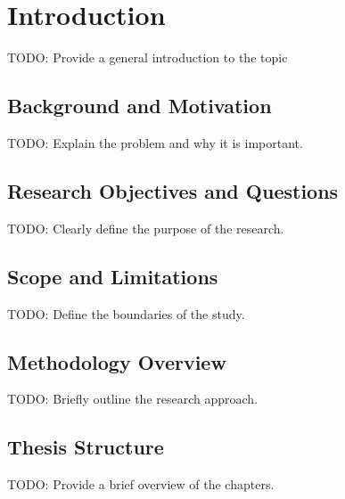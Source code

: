 \chapter{Introduction}
\label{sec:introduction}

TODO: Provide a general introduction to the topic

\section{Background and Motivation}
TODO: Explain the problem and why it is important.

\section{Research Objectives and Questions}
TODO: Clearly define the purpose of the research.

\section{Scope and Limitations}
TODO: Define the boundaries of the study.

\section{Methodology Overview}
TODO: Briefly outline the research approach.

\section{Thesis Structure}
TODO: Provide a brief overview of the chapters.

